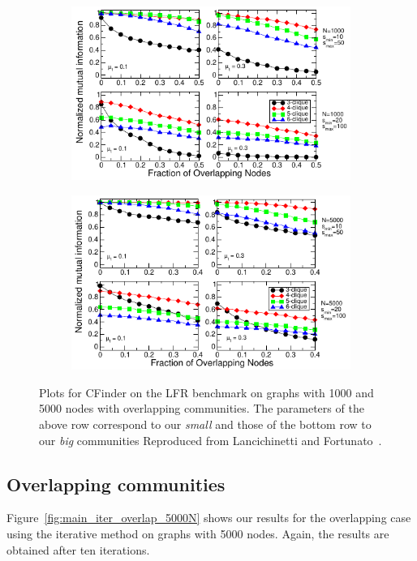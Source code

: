 \begin{figure}[h!]
    \centering
    \begin{subfigure}{0.5\textwidth}
    \centering
    \includegraphics[width=\cfinderwidth]{lfrpaper/fig6.pdf}
    \end{subfigure}%
    \begin{subfigure}{0.5\textwidth}
    \centering
    \includegraphics[width=\cfinderwidth]{lfrpaper/fig7.pdf}
    \end{subfigure}%
    \caption{
        Plots for CFinder on the LFR benchmark on graphs with 1000 and 5000 nodes 
		with overlapping communities. The parameters of the above row correspond to our \textit{small} and those of the bottom row to our \textit{big} communities Reproduced from Lancichinetti and Fortunato~\cite{LF09}.
    }\label{fig:main_CFinder_overlapping}
\end{figure}



\subsection{Overlapping communities}
Figure~\ref{fig:main_iter_overlap_5000N} shows our results for the overlapping case using the iterative method on graphs with 5000 nodes. Again, the results are obtained after ten iterations.


